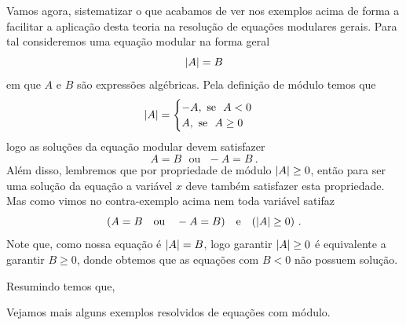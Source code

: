  Vamos agora, sistematizar o que acabamos de ver nos exemplos acima de forma a facilitar a aplicação desta teoria na resolução de equações modulares gerais. Para tal consideremos uma equação modular na forma geral
\begin{equation}
\left|A\right|= B
\end{equation}
 em que $A$ e $B$ são expressões algébricas. Pela definição de módulo temos que
 \[ \left|A\right|= \begin{cases}
          -A, \ \text{se} \ \ A < 0 \\
           A, \ \text{se} \ \ A \geq 0
         \end{cases}
 \]
 logo as soluções da equação modular devem satisfazer
\begin{equation}
A= B \ \ \ \text{ou} \ \ \ -A= B \ .
\end{equation}
 Além disso, lembremos que por propriedade de módulo $\left|A\right|\geq 0$, então para ser uma solução da equação a variável $x$ deve também satisfazer esta propriedade. Mas como vimos no contra-exemplo acima nem toda variável satifaz
\begin{equation}
(A= B \ \ \ \text{ou} \ \ \ -A= B) \ \ \ \text{e} \ \ \ (\left|A\right|\geq 0) \ . 
\end{equation}
 Note que, como nossa equação é $\left|A\right|= B$, logo garantir $\left|A\right|\geq 0$ é equivalente a garantir $B \geq 0$, donde obtemos que as equações com $B < 0$ não possuem solução.

 Resumindo temos que,

  \vskip0.3cm
 \vskip0.3cm

 Vejamos mais alguns exemplos resolvidos de equações com módulo.

